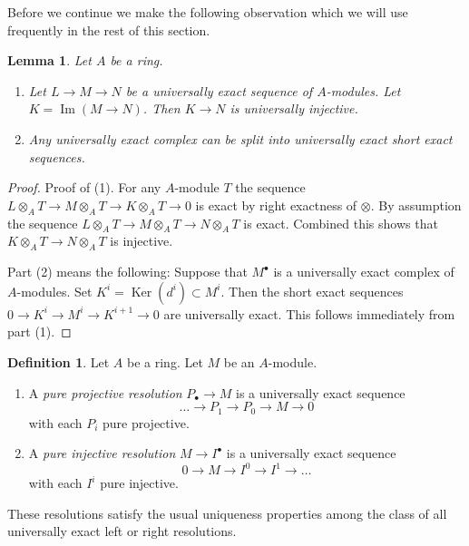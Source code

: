 \documentclass{stacks-project}
\theoremstyle{plain}
\newtheorem{lemma}[subsection]{Lemma}
\theoremstyle{definition}
\newtheorem{definition}[subsection]{Definition}
\theoremstyle{remark}
\numberwithin{equation}{subsection}
\def\Ker{\mathop{\mathrm{Ker}}}
\def\Im{\mathop{\mathrm{Im}}}
\begin{document}
\noindent
Before we continue we make the following observation which we will
use frequently in the rest of this section.

\begin{lemma}
\label{lemma-split-universally-exact-sequence}
Let $A$ be a ring.
\begin{enumerate}
\item Let $L \to M \to N$ be a universally exact sequence
of $A$-modules. Let $K = \Im(M \to N)$.
Then $K \to N$ is universally injective.
\item Any universally exact complex
can be split into universally exact short exact sequences.
\end{enumerate}
\end{lemma}

\begin{proof}
Proof of (1). For any $A$-module $T$ the sequence
$L \otimes_A T \to M \otimes_A T \to K \otimes_A T \to 0$ is exact
by right exactness of $\otimes$. By assumption the sequence
$L \otimes_A T \to M \otimes_A T \to N \otimes_A T$ is exact.
Combined this shows that $K \otimes_A T \to N \otimes_A T$ is injective.

\medskip\noindent
Part (2) means the following: Suppose that $M^\bullet$ is a universally
exact complex of $A$-modules. Set $K^i = \Ker(d^i) \subset M^i$.
Then the short exact sequences $0 \to K^i \to M^i \to K^{i + 1} \to 0$
are universally exact. This follows immediately from part (1).
\end{proof}

\begin{definition}
\label{definition-pure-resolution}
Let $A$ be a ring. Let $M$ be an $A$-module.
\begin{enumerate}
\item A {\it pure projective resolution} $P_\bullet \to M$
is a universally exact sequence
$$
\ldots \to P_1 \to P_0 \to M \to 0
$$
with each $P_i$ pure projective.
\item A {\it pure injective resolution} $M \to I^\bullet$ is a universally
exact sequence
$$
0 \to M \to I^0 \to I^1 \to \ldots
$$
with each $I^i$ pure injective.
\end{enumerate}
\end{definition}

\noindent
These resolutions satisfy the usual uniqueness properties among the class
of all universally exact left or right resolutions.
\end{document}
